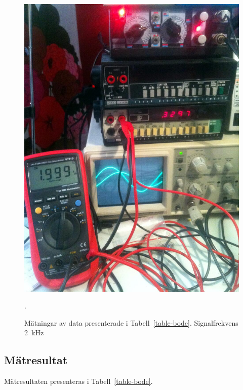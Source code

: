 \begin{figure}\label{fig:bode-foto-2000}
  \centering
  \includegraphics[width=\linewidth]{img/bode_2000Hz.jpg}
  \caption[] {Mätningar av data presenterade i Tabell~\ref{table-bode}.
              Signalfrekvens \SI{2}{\kHz}}.
\end{figure}


\subsection{Mätresultat}
Mätresultaten presenteras i Tabell~\ref{table-bode}.

